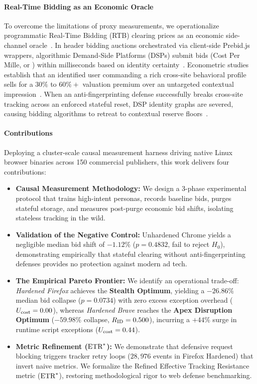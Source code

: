 \paragraph{Real-Time Bidding as an Economic Oracle}
To overcome the limitations of proxy measurements, we operationalize programmatic Real-Time Bidding (RTB) clearing prices as an economic side-channel oracle~\cite{castelluccia2014selling, bashir2016tracing, liu2025first}. 
In header bidding auctions orchestrated via client-side Prebid.js wrappers, algorithmic Demand-Side Platforms (DSPs) submit bids (Cost Per Mille, or \cpm) within milliseconds based on identity certainty~\cite{pachilakis2019no, cook2020inferring}. 
Econometric studies establish that an identified user commanding a rich cross-site behavioral profile sells for a $30\%$ to $60\%+$ valuation premium over an untargeted contextual impression~\cite{beales2014empirical, johnson2020consumer, google2019cookie}. 
When an anti-fingerprinting defense successfully breaks cross-site tracking across an enforced stateful reset, DSP identity graphs are severed, causing bidding algorithms to retreat to contextual reserve floors~\cite{barysei2023investigating}.

\paragraph{Contributions}
Deploying a cluster-scale causal measurement harness driving native Linux browser binaries across 150 commercial publishers, this work delivers four contributions:
\begin{itemize}
    \item \textbf{Causal Measurement Methodology:} We design a 3-phase experimental protocol that trains high-intent personas, records baseline bids, purges stateful storage, and measures post-purge economic bid shifts, isolating stateless tracking in the wild.
    \item \textbf{Validation of the Negative Control:} Unhardened Chrome yields a negligible median bid shift of \textbf{$-1.12\%$} ($p = 0.4832$, fail to reject $H_0$), demonstrating empirically that stateful clearing without anti-fingerprinting defenses provides no protection against modern ad tech.
    \item \textbf{The Empirical Pareto Frontier:} We identify an operational trade-off: \textit{Hardened Firefox} achieves the \textbf{Stealth Optimum}, yielding a $-26.86\%$ median bid collapse ($p = 0.0734$) with zero excess exception overhead ($U_{\text{cost}} = 0.00$), whereas \textit{Hardened Brave} reaches the \textbf{Apex Disruption Optimum} ($-59.98\%$ collapse, $R_{\text{ID}} = 0.500$), incurring a $+44\%$ surge in runtime script exceptions ($U_{\text{cost}} = 0.44$).
    \item \textbf{Metric Refinement ($\text{ETR}^*$):} We demonstrate that defensive request blocking triggers tracker retry loops ($28,976$ events in Firefox Hardened) that invert naive metrics. We formalize the Refined Effective Tracking Resistance metric ($\text{ETR}^*$), restoring methodological rigor to web defense benchmarking.
\end{itemize}